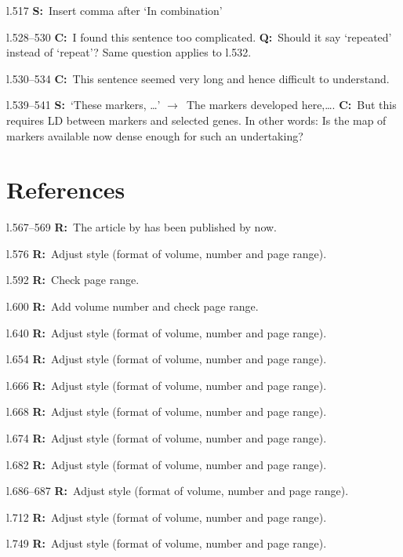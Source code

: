 \documentclass[11pt]{article}
\newenvironment{my_description}
{\begin{description}
  \setlength{\itemsep}{2pt}
  \setlength{\parskip}{0pt}
  \setlength{\parsep}{0pt}}
{\end{description}}
\newcommand{\ra}{$\rightarrow$\ }
\newcommand{\C}{\textbf{C:}\ }
\newcommand{\Q}{\textbf{Q:}\ }
\newcommand{\R}{\textbf{R:}\ }
\newcommand{\V}{\textbf{S:}\ }
\begin{document}
\begin{my_description}
	\item[l.517] \V Insert comma after `In combination'
	\item[l.528--530] \C I found this sentence too complicated. \Q Should it say `repeated' instead of `repeat'? Same question applies to l.532.
	\item[l.530--534] \C This sentence seemed very long and hence difficult to understand.
	\item[l.539--541] \V `These markers, \dots' \ra The markers developed here,\dots. \C But this requires LD between markers and selected genes. In other words: Is the map of markers available now dense enough for such an undertaking?
\end{my_description}
	
\section{References}
\begin{my_description}
	\item[l.567--569] \R The article by \citet{Blum:2012fk} has been published by now.
	\item[l.576] \R Adjust style (format of volume, number and page range).
	\item[l.592] \R Check page range.
	\item[l.600] \R Add volume number and check page range.
	\item[l.640] \R Adjust style (format of volume, number and page range).
	\item[l.654] \R Adjust style (format of volume, number and page range).
	\item[l.666] \R Adjust style (format of volume, number and page range).
	\item[l.668] \R Adjust style (format of volume, number and page range).
	\item[l.674] \R Adjust style (format of volume, number and page range).
	\item[l.682] \R Adjust style (format of volume, number and page range).
	\item[l.686--687] \R Adjust style (format of volume, number and page range).
	\item[l.712] \R Adjust style (format of volume, number and page range).
	\item[l.749] \R Adjust style (format of volume, number and page range).
\end{my_description}
\end{document}
